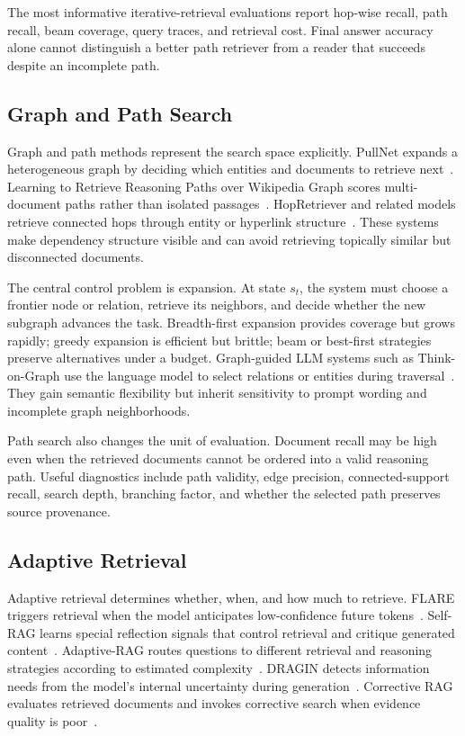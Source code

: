 The most informative iterative-retrieval evaluations report hop-wise recall, path recall, beam coverage, query traces, and retrieval cost. Final answer accuracy alone cannot distinguish a better path retriever from a reader that succeeds despite an incomplete path.

\subsection{Graph and Path Search}
\label{subsec:graph_path_search}

Graph and path methods represent the search space explicitly. PullNet expands a heterogeneous graph by deciding which entities and documents to retrieve next~\cite{sun2019pullnet}. Learning to Retrieve Reasoning Paths over Wikipedia Graph scores multi-document paths rather than isolated passages~\cite{asai2020learning}. HopRetriever and related models retrieve connected hops through entity or hyperlink structure~\cite{li2020hopretriever}. These systems make dependency structure visible and can avoid retrieving topically similar but disconnected documents.

The central control problem is expansion. At state $s_t$, the system must choose a frontier node or relation, retrieve its neighbors, and decide whether the new subgraph advances the task. Breadth-first expansion provides coverage but grows rapidly; greedy expansion is efficient but brittle; beam or best-first strategies preserve alternatives under a budget. Graph-guided LLM systems such as Think-on-Graph use the language model to select relations or entities during traversal~\cite{sun2024tog}. They gain semantic flexibility but inherit sensitivity to prompt wording and incomplete graph neighborhoods.

Path search also changes the unit of evaluation. Document recall may be high even when the retrieved documents cannot be ordered into a valid reasoning path. Useful diagnostics include path validity, edge precision, connected-support recall, search depth, branching factor, and whether the selected path preserves source provenance.

\subsection{Adaptive Retrieval}
\label{subsec:adaptive_retrieval}

Adaptive retrieval determines whether, when, and how much to retrieve. FLARE triggers retrieval when the model anticipates low-confidence future tokens~\cite{jiang2023flare}. Self-RAG learns special reflection signals that control retrieval and critique generated content~\cite{asai2024selfrag}. Adaptive-RAG routes questions to different retrieval and reasoning strategies according to estimated complexity~\cite{jeong2024adaptiverag}. DRAGIN detects information needs from the model's internal uncertainty during generation~\cite{su2024dragin}. Corrective RAG evaluates retrieved documents and invokes corrective search when evidence quality is poor~\cite{yan2024crag}.

